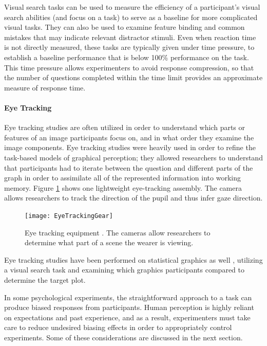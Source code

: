 \documentclass[11pt]{isuthesis}\usepackage[]{graphicx}\usepackage[]{color}
\begin{document}
Visual search tasks can be used to measure the efficiency of a participant's visual search abilities (and focus on a task) to serve as a baseline for more complicated visual tasks. They can also be used to examine feature binding and common mistakes that may indicate relevant distractor stimuli. Even when reaction time is not directly measured, these tasks are typically given under time pressure, to establish a baseline performance that is below 100\% performance on the task. This time pressure allows experimenters to avoid response compression, so that the number of questions completed within the time limit provides an approximate measure of response time.

\paragraph{Eye Tracking} \label{eyetracking}
Eye tracking studies are often utilized in order to understand which parts or features of an image participants focus on, and in what order they examine the image components. Eye tracking studies were heavily used in order to refine the task-based models of graphical perception; they allowed researchers to understand that participants had to iterate between the question and different parts of the graph in order to assimilate all of the represented information into working memory. Figure \ref{fig:eyetracking} shows one lightweight eye-tracking assembly. The camera allows researchers to track the direction of the pupil and thus infer gaze direction. 

\begin{figure}[htbp]\centering
\texttt{[image: EyeTrackingGear]}
\caption[Eye tracking equipment]{Eye tracking equipment \protect\citep{babcock2004building}. The cameras allow researchers to determine what part of a scene the wearer is viewing.}\label{fig:eyetracking}
\end{figure}

Eye tracking studies have been performed on statistical graphics as well \citep{zhao2013mind}, utilizing a visual search task and examining which graphics participants compared to determine the target plot.

In some psychological experiments, the straightforward approach to a task can produce biased responses from participants. Human perception is highly reliant on expectations and past experience, and as a result, experimenters must take care to reduce undesired biasing effects in order to appropriately control experiments. Some of these considerations are discussed in the next section. 
\end{document}
